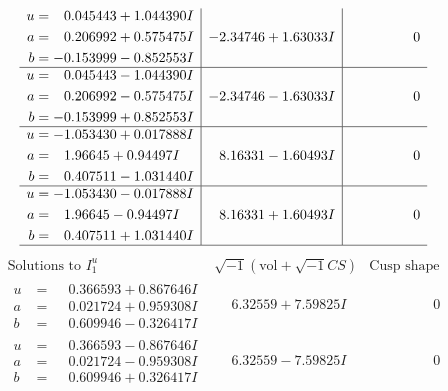 \documentclass[1p]{elsarticle_modified}
\theoremstyle{definition}
\newcommand{\I}{\sqrt{-1}}
\begin{document}
$$\begin{array}{c|c|c}
\begin{aligned}
u &= \phantom{-}0.045443 + 1.044390 I \\
a &= \phantom{-}0.206992 + 0.575475 I \\
b &= -0.153999 - 0.852553 I\end{aligned}
 & -2.34746 + 1.63033 I & \phantom{-0.000000 } 0 \\ \hline\begin{aligned}
u &= \phantom{-}0.045443 - 1.044390 I \\
a &= \phantom{-}0.206992 - 0.575475 I \\
b &= -0.153999 + 0.852553 I\end{aligned}
 & -2.34746 - 1.63033 I & \phantom{-0.000000 } 0 \\ \hline\begin{aligned}
u &= -1.053430 + 0.017888 I \\
a &= \phantom{-}1.96645 + 0.94497 I \\
b &= \phantom{-}0.407511 - 1.031440 I\end{aligned}
 & \phantom{-}8.16331 - 1.60493 I & \phantom{-0.000000 } 0 \\ \hline\begin{aligned}
u &= -1.053430 - 0.017888 I \\
a &= \phantom{-}1.96645 - 0.94497 I \\
b &= \phantom{-}0.407511 + 1.031440 I\end{aligned}
 & \phantom{-}8.16331 + 1.60493 I & \phantom{-0.000000 } 0\\
 \hline 
 \end{array}$$\newpage$$\begin{array}{c|c|c}  
\text{Solutions to }I^u_{1}& \I (\text{vol} + \sqrt{-1}CS) & \text{Cusp shape}\\
 \hline 
\begin{aligned}
u &= \phantom{-}0.366593 + 0.867646 I \\
a &= \phantom{-}0.021724 + 0.959308 I \\
b &= \phantom{-}0.609946 - 0.326417 I\end{aligned}
 & \phantom{-}6.32559 + 7.59825 I & \phantom{-0.000000 } 0 \\ \hline\begin{aligned}
u &= \phantom{-}0.366593 - 0.867646 I \\
a &= \phantom{-}0.021724 - 0.959308 I \\
b &= \phantom{-}0.609946 + 0.326417 I\end{aligned}
 & \phantom{-}6.32559 - 7.59825 I & \phantom{-0.000000 } 0 \\ \hline\begin{aligned}

\end{aligned}
\end{array}$$
\end{document}
